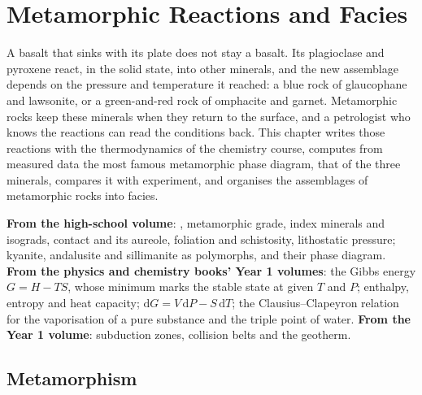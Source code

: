 \chapter{Metamorphic Reactions and Facies}\label{ch:b2:metamorphic-facies}

A basalt that sinks with its plate does not stay a basalt. Its plagioclase and pyroxene
react, in the solid state, into other minerals, and the new assemblage depends on the
pressure and temperature it reached: a blue rock of glaucophane and lawsonite, or a
green-and-red rock of omphacite and garnet. Metamorphic rocks keep these minerals when
they return to the surface, and a petrologist who knows the reactions can read the
conditions back. This chapter writes those reactions with the thermodynamics of the
chemistry course, computes from measured data the most famous metamorphic phase diagram,
that of the three  minerals, compares it with experiment, and organises the
assemblages of metamorphic rocks into facies.

\begin{recall}
\textbf{From the high-school volume}: , metamorphic grade, index minerals
and isograds, contact  and its aureole, foliation and schistosity,
lithostatic pressure; kyanite, andalusite and sillimanite as polymorphs, and their
phase diagram. \textbf{From the physics and chemistry books' Year 1 volumes}: the Gibbs
energy $G = H - TS$, whose minimum marks the stable state at given $T$ and $P$;
enthalpy, entropy and heat capacity; $\mathrm dG = V\,\mathrm dP - S\,\mathrm dT$; the
Clausius--Clapeyron relation for the vaporisation of a pure substance and the triple
point of water. \textbf{From the Year 1 volume}: subduction zones, collision belts and
the geotherm.
\end{recall}

\section{Metamorphism}\label{sec:b2:metamorphic-facies:metamorphism}

